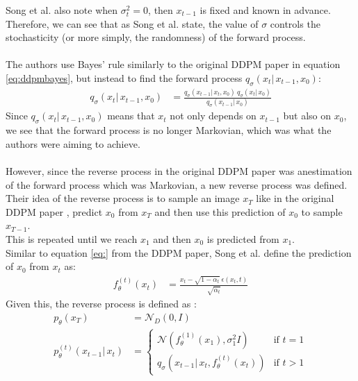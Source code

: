 \documentclass[twoside]{article}
\numberwithin{equation}{section}
\numberwithin{figure}{section}
\begin{document}
Song et al. \cite{song2022denoising} also note when $\sigma_t^2 = 0$, then $x_{t-1}$ is fixed and known in advance. \\
Therefore, we can see that as Song et al. \cite{song2022denoising} state, the value of $\sigma$ controls the stochasticity (or more simply, the randomness) of the forward process.
\\\\
The authors use Bayes' rule similarly to the original DDPM paper \cite{ho2020denoising} in equation \ref{eq:ddpmbayes}, but instead to find the forward process $q_\sigma(x_t | \, x_{t-1}, x_0)$:
\begin{align}
  q_{\sigma}(x_t | \, x_{t-1}, x_0) &= \frac{q_\sigma (x_{t-1} | \, x_t, x_0) \: q_\sigma (x_t | \, x_0)}{q_\sigma (x_{t-1} | \, x_0)}
\end{align}
Since $q_\sigma (x_t | \, x_{t-1}, x_0)$ means that $x_t$ not only depends on $x_{t-1}$ but also on $x_0$, we see that the forward process is no longer Markovian, which was what the authors were aiming to achieve. \cite{song2022denoising}
\\\\
However, since the reverse process in the original DDPM paper \cite{ho2020denoising} was anestimation of the forward process which was Markovian, a new reverse process was defined. \\
Their idea of the reverse process is to sample an image $x_T$ like in the original DDPM paper \cite{ho2020denoising}, predict $x_0$ from $x_T$ and then use this prediction of $x_0$ to sample $x_{T-1}$. \cite{song2022denoising} \\
This is repeated until we reach $x_1$ and then $x_0$ is predicted from $x_1$. \cite{song2022denoising} \\
Similar to equation \ref{eq:} from the DDPM paper, Song et al. \cite{song2022denoising} define the prediction of $x_0$ from $x_t$ as:
\begin{align}
  f_\theta^{(t)} (x_t) &= \frac{x_t - \sqrt{1 - \bar{\alpha}_t} \: \epsilon(x_t, t)}{\sqrt{\bar{\alpha}_t}}
\end{align}
Given this, the reverse process is defined as \cite{song2022denoising}:
\begin{align}
  p_\theta (x_T) &= \mathcal{N}_D(0, I) \\
  p_\theta^{(t)} (x_{t-1} | \, x_t) &= \begin{cases}
    \mathcal{N}(f_\theta^{(1)}(x_{1}), \sigma_1^2 I) & \text{if } t = 1 \\
    q_\sigma(x_{t-1} | \, x_t, f_\theta^{(t)}(x_t)) & \text{if } t > 1
  \end{cases}
\end{align}
\end{document}

